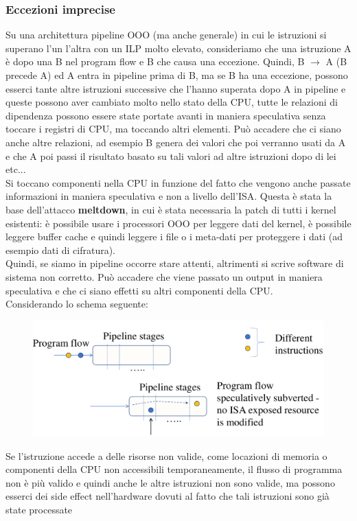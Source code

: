 \documentclass[14pt, oneside]{book}
\begin{document}
\subsubsection{Eccezioni imprecise}
Su una architettura pipeline OOO (ma anche generale) in cui le istruzioni si superano l'un l'altra con un ILP molto elevato, consideriamo che una istruzione A è dopo una B nel program flow e B che causa una eccezione. Quindi, B $\rightarrow$ A (B precede A) ed A entra in pipeline prima di B, ma se B ha una eccezione, possono esserci tante altre istruzioni successive che l'hanno superata dopo A in pipeline e queste possono aver cambiato molto nello stato della CPU, tutte le relazioni di dipendenza possono essere state portate avanti in maniera speculativa senza toccare i registri di CPU, ma toccando altri elementi. Può accadere che ci siano anche altre relazioni, ad esempio B genera dei valori che poi verranno usati da A e che A poi passi il risultato basato su tali valori ad altre istruzioni dopo di lei etc... \\ Si toccano componenti nella CPU in funzione del fatto che vengono anche passate informazioni in maniera speculativa e non a livello dell'ISA. Questa è stata la base dell'attacco \textbf{meltdown}, in cui è stata necessaria la patch di tutti i kernel esistenti: è possibile usare i processori OOO per leggere dati del kernel, è possibile leggere buffer cache e quindi leggere i file o i meta-dati per proteggere i dati (ad esempio dati di cifratura).
\\ Quindi, se siamo in pipeline occorre stare attenti, altrimenti si scrive software di sistema non corretto. Può accadere che viene passato un output in maniera speculativa e che ci siano effetti su altri componenti della CPU. \\ Considerando lo schema seguente:
\begin{figure}[!ht]
\includegraphics[scale=0.15]{immagini/not_valid_instr}
\end{figure}
Se l'istruzione accede a delle risorse non valide, come locazioni di memoria o componenti della CPU non accessibili temporaneamente, il flusso di programma non è più valido e quindi anche le altre istruzioni non sono valide, ma possono esserci dei side effect nell'hardware dovuti al fatto che tali istruzioni sono già state processate
\end{document}
